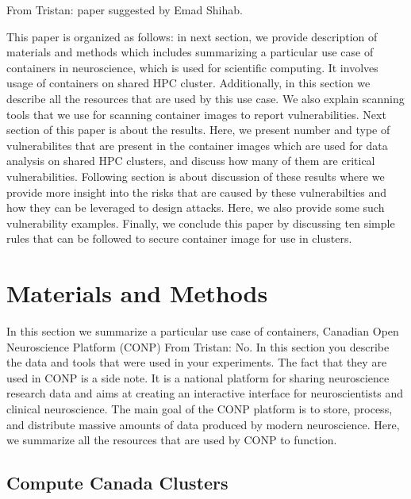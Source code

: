 \documentclass[a4paper,num-refs]{oup-contemporary}
\newcommand{\TG}[1]{\color{blue}From Tristan: #1\color{black}}
\begin{document}
\TG{paper suggested by Emad Shihab.}

This paper is organized as follows: in next section, we provide description
of materials and methods which includes summarizing a particular use case of
containers in neuroscience, which is used for scientific computing. It involves
usage of containers on shared HPC cluster. Additionally, in this section we
describe all the resources that are used by this use case. We also explain
scanning tools that we use for scanning container images to report
vulnerabilities. Next section of this paper is about the results. Here, we
present number and type of vulnerabilites that are present in the container images
which are used for data analysis on shared HPC clusters, and discuss how many of them are
critical vulnerabilities. Following section is about discussion of these results
where we provide more insight into the risks that are caused by these vulnerabilties
and how they can be leveraged to design attacks. Here, we also provide some such
vulnerability examples. Finally, we conclude this paper by discussing ten simple
rules that can be followed to secure container image for use in clusters.

\section{Materials and Methods}

In this section we summarize a particular use case of containers, Canadian
Open Neuroscience Platform (CONP) \TG{No. In this section you describe the data and tools 
that were used in your experiments. The fact that they are used in CONP 
is a side note}. It is a national platform for sharing neuroscience
research data and aims at creating an interactive interface for neuroscientists and
clinical neuroscience. The main goal of the CONP platform is to store, process, and
distribute massive amounts of data produced by modern neuroscience.
Here, we summarize all the resources that are
used by CONP to function.

\subsection{Compute Canada Clusters}
\end{document}
